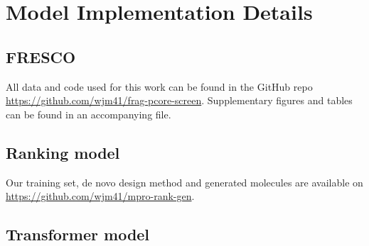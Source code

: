 \chapter{Model Implementation Details} \label{appendix:details}

\section{FRESCO}
All data and code used for this work can be found in the GitHub repo \url{https://github.com/wjm41/frag-pcore-screen}. Supplementary figures and tables can be found in an accompanying file.

\section{Ranking model}
Our training set, de novo design method and generated molecules are available on \url{https://github.com/wjm41/mpro-rank-gen}.

\section{Transformer model}
\section{}